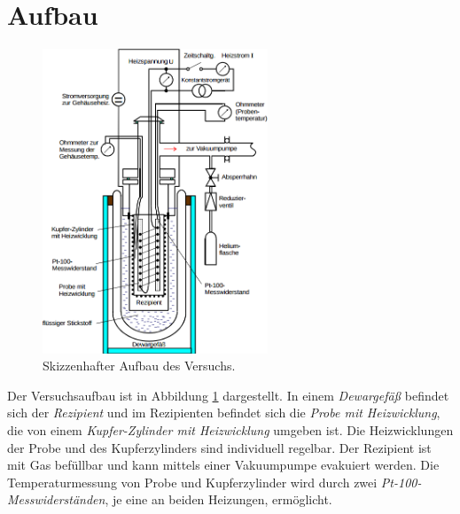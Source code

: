 \section{Aufbau}
\begin{figure}
	\centering
	\includegraphics[width=0.6\textwidth,]{graphics/aufbau.png}
	\caption{Skizzenhafter Aufbau des Versuchs. \cite{skript}}
	\label{fig:aufbau}
\end{figure}
Der Versuchsaufbau ist in Abbildung \ref{fig:aufbau} dargestellt.
In einem \emph{Dewargefäß} befindet sich der \emph{Rezipient} und im Rezipienten befindet sich die \emph{Probe mit Heizwicklung}, die von einem \emph{Kupfer-Zylinder mit Heizwicklung} umgeben ist.
Die Heizwicklungen der Probe und des Kupferzylinders sind individuell regelbar.
Der Rezipient ist mit Gas befüllbar und kann mittels einer Vakuumpumpe evakuiert werden. 
Die Temperaturmessung von Probe und Kupferzylinder wird durch zwei \emph{Pt-100-Messwiderständen}, je eine an beiden Heizungen, ermöglicht.


